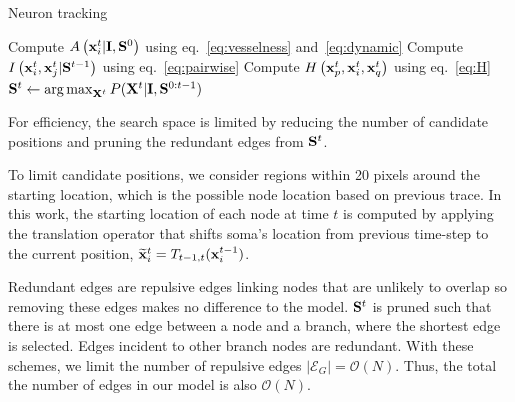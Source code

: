 \documentclass{article}
\DeclareMathOperator*{\argmax}{arg\,max}
\begin{document}
\begin{algorithm}
	\small
	\caption{Neuron tracking} \label{alg:track}
	\begin{algorithmic}[1]
		\State Compute $A\left( {\bf x}_i^t | {\bf I}, {\bf S}^0 \right)$ using eq.~\ref{eq:vesselness} and~\ref{eq:dynamic}
		\State Compute $I\left({\bf x}_i^t,{\bf x}_j^t | {\bf S}^{t-1}\right)$ using eq.~\ref{eq:pairwise}
		\State Compute $H\left({\bf x}_p^t,{\bf x}_i^t,{\bf x}_q^t\right)$ using eq.~\ref{eq:H}
		\State ${\bf S}^t \gets \argmax_{{\bf X}^t} P( {\bf X}^t | {\bf I},{\bf S}^{0:t-1} )$ \label{alg:track:optimize}
		\EndFor
		\State {}
		\EndProcedure
	\end{algorithmic}
\end{algorithm}

For efficiency, the search space is limited by reducing the number of candidate positions and pruning the redundant edges from ${\bf S}^t$.

To limit candidate positions, we consider regions within 20 pixels around the starting location, which is the possible node location based on previous trace. In this work, the starting location of each node at time $t$ is computed by applying the translation operator that shifts soma's location from previous time-step to the current position, $\widetilde{\bf x}^t_i = T_{t-1,t}({\bf x}^{t-1}_i)$. 

Redundant edges are repulsive edges linking nodes that are unlikely to overlap so removing these edges makes no difference to the model. ${\bf S}^t$ is pruned such that there is at most one edge between a node and a branch, where the shortest edge is selected. Edges incident to other branch nodes are redundant. With these schemes, we limit the number of repulsive edges $|\mathcal{E}_G|=\mathcal{O}(N)$. Thus, the total the number of edges in our model is also $\mathcal{O}(N)$.
\end{document}
